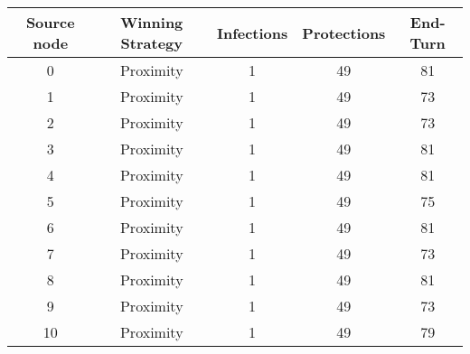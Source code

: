 \documentclass[results.tex]{subfiles}
\begin{document}
    \begin{center}
        \begin{tabular}{| c || c | c | c | c |}
            \hline
            {\bfseries Source node} & {\bfseries Winning Strategy} & {\bfseries Infections} & {\bfseries Protections}
            & {\bfseries End-Turn}
            \\  %
            \hline\hline
            0                       & Proximity                    & 1                      & 49                      & 81                   \\
            \hline
            1                       & Proximity                    & 1                      & 49                      & 73                   \\
            \hline
            2                       & Proximity                    & 1                      & 49                      & 73                   \\
            \hline
            3                       & Proximity                    & 1                      & 49                      & 81                   \\
            \hline
            4                       & Proximity                    & 1                      & 49                      & 81                   \\
            \hline
            5                       & Proximity                    & 1                      & 49                      & 75                   \\
            \hline
            6                       & Proximity                    & 1                      & 49                      & 81                   \\
            \hline
            7                       & Proximity                    & 1                      & 49                      & 73                   \\
            \hline
            8                       & Proximity                    & 1                      & 49                      & 81                   \\
            \hline
            9                       & Proximity                    & 1                      & 49                      & 73                   \\
            \hline
            10                      & Proximity                    & 1                      & 49                      & 79                   \\

\end{tabular}
\end{center}
\end{document}
